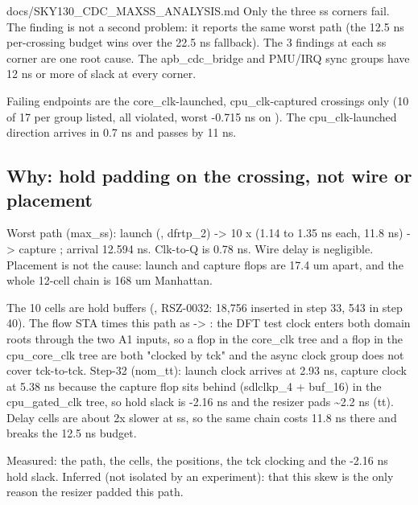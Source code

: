 \begin{relocated}{docs/SKY130_CDC_MAXSS_ANALYSIS.md}
Only the three ss corners fail. The  finding
is not a second problem: it reports the same worst path (the 12.5 ns
per-crossing budget wins over the 22.5 ns fallback). The 3 findings at
each ss corner are one root cause. The
apb\_\allowbreak{}cdc\_\allowbreak{}bridge and PMU/IRQ sync groups have
12 ns or more of slack at every corner.

Failing endpoints are the core\_\allowbreak{}clk-launched,
cpu\_\allowbreak{}clk-captured crossings only (10 of 17 per group
listed, all violated, worst -0.715 ns on ). The
cpu\_\allowbreak{}clk-launched direction arrives in 0.7 ns and passes by
11 ns.

\subsection{Why: hold padding on the crossing, not wire or placement}\label{tm:pd:sky130-cdc-maxss:2-why-hold-padding-on-the-crossing-not-wire-or-placement}

Worst path (max\_ss): launch 
(, dfrtp\_2) -\textgreater{}
10 x  (1.14 to 1.35 ns each, 11.8 ns)
-\textgreater{} capture ; arrival 12.594 ns. Clk-to-Q
is 0.78 ns. Wire delay is negligible. Placement is not the cause: launch
and capture flops are 17.4 um apart, and the whole 12-cell chain is 168
um Manhattan.

The 10 cells are hold buffers (, RSZ-0032: 18,756 inserted
in step 33, 543 in step 40). The flow STA times this path as 
-\textgreater{} : the DFT test clock enters both domain roots
through the two  A1 inputs, so a flop in the core\_clk
tree and a flop in the cpu\_\allowbreak{}core\_\allowbreak{}clk tree are
both "clocked by tck" and the async clock group does not cover
tck-to-tck. Step-32  (nom\_tt): launch clock arrives at
2.93 ns, capture clock at 5.38 ns because the capture flop sits behind
 (sdlclkp\_\allowbreak{}4 + buf\_16) in the
cpu\_\allowbreak{}gated\_\allowbreak{}clk tree, so hold slack is -2.16
ns and the resizer pads \textasciitilde2.2 ns (tt). Delay cells are
about 2x slower at ss, so the same chain costs 11.8 ns there and breaks
the 12.5 ns budget.

Measured: the path, the cells, the positions, the tck clocking and the
-2.16 ns hold slack. Inferred (not isolated by an experiment): that this
skew is the only reason the resizer padded this path.


\end{relocated}
